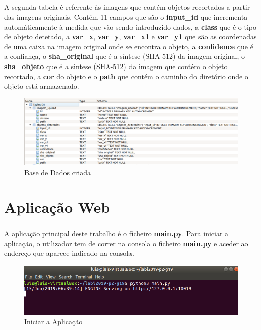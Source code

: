 \documentclass{report}
\begin{document}
\paragraph{}

A segunda tabela é referente às imagens que contém objetos recortados a partir das imagens originais. Contém 11 campos que são o \textbf{input\_id} que incrementa automáticamente à medida que vão sendo introduzido dados, a \textbf{class} que é o tipo de objeto detetado, a \textbf{var\_x}, \textbf{var\_y}, \textbf{var\_x1} e \textbf{var\_y1} que são as coordenadas de uma caixa na imagem original onde se encontra o objeto, a \textbf{confidence} que é a confiança, o \textbf{sha\_original} que é a síntese (SHA-512) da imagem original, o \textbf{sha\_objeto} que é a sintese (SHA-512) da imagem que contém o objeto recortado, a \textbf{cor} do objeto e o \textbf{path} que contém o caminho do diretório onde o objeto está armazenado.

\begin{figure}[H]
\centering
\includegraphics[width=1\linewidth]{db.png}
\caption{Base de Dados criada}
\end{figure}



\chapter{Aplicação Web}
\label{chap.aplicação}
\paragraph{}
A aplicação principal deste trabalho é o ficheiro \textbf{main.py}. Para iniciar a aplicação, o utilizador tem de correr na consola o ficheiro \textbf{main.py} e aceder ao endereço que aparece indicado na consola.


\begin{figure}[H]
\centering
\includegraphics[width=1\linewidth]{app.png}
\caption{Iniciar a Aplicação}
\end{figure}
\end{document}
